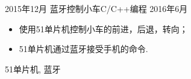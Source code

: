 \begin{experiences}
  \experience
  {2015年12月}   {蓝牙控制小车}{C/C++编程}{}
  {2016年6月} {
    \begin{itemize}
      \item 使用51单片机控制小车的前进，后退，转向；
      \item 51单片机通过蓝牙接受手机的命令.                                                                                       
      \end{itemize}
  }
  {51单片机, 蓝牙}
  \emptySeparator


\end{experiences}
